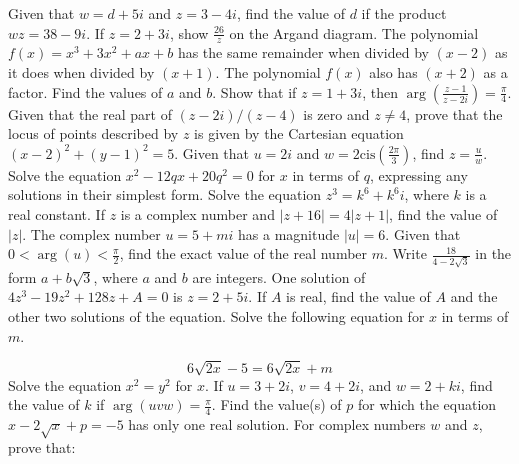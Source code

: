 \documentclass[12pt,addpoints]{exam}
\begin{document}
\begin{questions}
\fillwithlines{3cm}
\question[5] Given that \( w = d + 5i \) and \( z = 3 - 4i \), find the value of \( d \) if the product \( wz = 38 - 9i \).
\fillwithlines{3cm}
\question[5] If \( z = 2 + 3i \), show \(\frac{26}{z}\) on the Argand diagram.
\fillwithlines{3cm}
\question[5] The polynomial \( f(x) = x^3 + 3x^2 + ax + b \) has the same remainder when divided by \( (x - 2) \) as it does when divided by \( (x + 1) \). The polynomial \( f(x) \) also has \( (x + 2) \) as a factor. Find the values of \( a \) and \( b \).
\fillwithlines{3cm}
\question[5] Show that if \( z = 1 + 3i \), then \(\arg \left( \frac{z - 1}{z - 2i} \right) = \frac{\pi}{4}\).
\fillwithlines{3cm}
\question[5] Given that the real part of \((z - 2i) / (z - 4)\) is zero and \(z \neq 4\), prove that the locus of points described by \(z\) is given by the Cartesian equation \((x - 2)^2 + (y - 1)^2 = 5\).
\fillwithlines{3cm}
\question[5] Given that \( u = 2i \) and \( w = 2 \text{cis} \left( \frac{2\pi}{3} \right) \), find \( z = \frac{u}{w} \).
\fillwithlines{3cm}
\question[5] Solve the equation \( x^2 - 12qx + 20q^2 = 0 \) for \( x \) in terms of \( q \), expressing any solutions in their simplest form.
\fillwithlines{3cm}
\question[5] Solve the equation \( z^3 = k^6 + k^6 i \), where \( k \) is a real constant.
\fillwithlines{3cm}
\question[5] If \( z \) is a complex number and \( |z + 16| = 4|z + 1| \), find the value of \( |z| \).
\fillwithlines{3cm}
\question[5] The complex number \( u = 5 + mi \) has a magnitude \( |u| = 6 \). Given that \( 0 < \arg(u) < \frac{\pi}{2} \), find the exact value of the real number \( m \).
\fillwithlines{3cm}
\question[5] Write \( \frac{18}{4 - 2\sqrt{3}} \) in the form \( a + b\sqrt{3} \), where \( a \) and \( b\) are integers.
\fillwithlines{3cm}
\question[5] One solution of \(4z^3 - 19z^2 + 128z + A = 0\) is \(z = 2 + 5i\). If \(A\) is real, find the value of \(A\) and the other two solutions of the equation.
\fillwithlines{3cm}
\question[5] Solve the following equation for \(x\) in terms of \(m\).

\[6\sqrt{2x} - 5 = 6\sqrt{2x} + m\]
\fillwithlines{3cm}
\question[5] Solve the equation \( x^2 = y^2 \) for \( x \).
\fillwithlines{3cm}
\question[5] If \( u = 3 + 2i \), \( v = 4 + 2i \), and \( w = 2 + ki \), find the value of \( k \) if \(\arg(uvw) = \frac{\pi}{4}\).
\fillwithlines{3cm}
\question[5] Find the value(s) of \( p \) for which the equation \( x - 2\sqrt{x} + p = -5 \) has only one real solution.
\fillwithlines{3cm}
\question[5] For complex numbers \( w \) and \( z \), prove that:


\end{questions}
\end{document}
